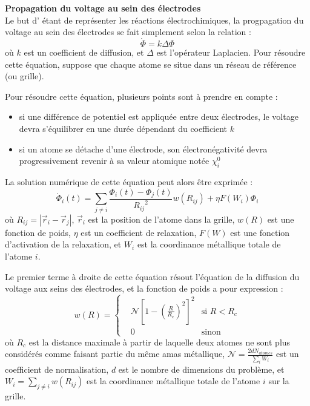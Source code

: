 \textbf{Propagation du voltage au sein des électrodes}\\
Le but d'\echemdid{} étant de représenter les réactions électrochimiques, la progpagation du voltage au sein des électrodes se fait simplement selon la relation :
\begin{equation}
    \dot{\Phi} = k \Delta \Phi
    \label{eq:echemdid_propagation}
\end{equation}
où $k$ est un coefficient de diffusion, et $\Delta$ est l'opérateur Laplacien. Pour résoudre cette équation, \echemdid{} suppose que chaque atome se situe dans un réseau de référence (ou grille).

Pour résoudre cette équation, plusieurs points sont à prendre en compte :
\begin{itemize}
    \item si une différence de potentiel est appliquée entre deux électrodes, le voltage devra s'équilibrer en une durée dépendant du coefficient $k$
    \item si un atome se détache d'une électrode, son électronégativité devra progressivement revenir à sa valeur atomique notée $\chi_i^0$
\end{itemize}

La solution numérique de cette équation peut alors être exprimée :
\begin{equation}
    \boxed%
    {
        \dot{\Phi}_i (t) = \sum_{j \neq i} \frac{\Phi_i (t) - \Phi_j (t)}{{R_{ij}}^2}w(R_{ij}) + \eta F(W_i) \Phi_i
    }
    \label{eq:echemdid_solution_numerique}
\end{equation}
où $R_{ij} = | \vec{r}_i - \vec{r}_j |$, $\vec{r}_i$ est la position de l'atome dans la grille, $w(R)$ est une fonction de poids, $\eta$ est un coefficient de relaxation, $F(W)$ est une fonction d'activation de la relaxation, et $W_i$ est la coordinance métallique totale de l'atome $i$.

Le premier terme à droite de cette équation résout l'équation de la diffusion du voltage aux seins des électrodes, et la fonction de poids a pour expression :
\begin{equation*}
    w(R) = \left\{
        \begin{aligned}
            &\mathcal{N} \left[ 1 - \left(\frac{R}{R_c}\right)^2 \right]^2 &\text{si } R < R_c\\
            &0 &\text{sinon}
        \end{aligned}
    \right.
\end{equation*}
où $R_c$ est la distance maximale à partir de laquelle deux atomes ne sont plus considérés comme faisant partie du même amas métallique, $\mathcal{N} = \frac{2 d N_{atomes}}{\sum_{i} W_i}$ est un coefficient de normalisation, $d$ est le nombre de dimensions du problème, et $W_i = \sum_{j \neq i} w(R_{ij})$ est la coordinance métallique totale de l'atome $i$ sur la grille.

